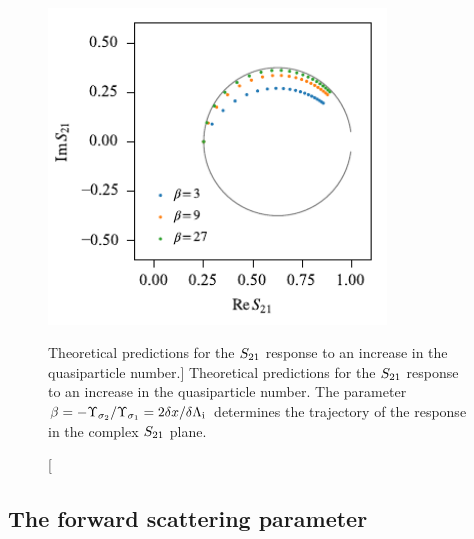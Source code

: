 \begin{figure}[htb]
\centering
\includegraphics[width=0.8\textwidth]{theory/s21_response.pdf}
\caption
[Theoretical predictions for the $S_{21}$ response to an increase in the quasiparticle number.]
{
Theoretical predictions for the $S_{21}$ response to an increase in the quasiparticle number.
The parameter
$\beta
  =
  - \Upsilon_{\sigma_2} / \Upsilon_{\sigma_1}
  =
  2 \delta x / \delta\Lambda_{\mathrm{i}}$
determines the trajectory of the response in the complex $S_{21}$ plane.
}
\label{fig:s21_response}
\end{figure}

\subsection{The forward scattering parameter}
\label{sec:theory.response.forwardscattering}

